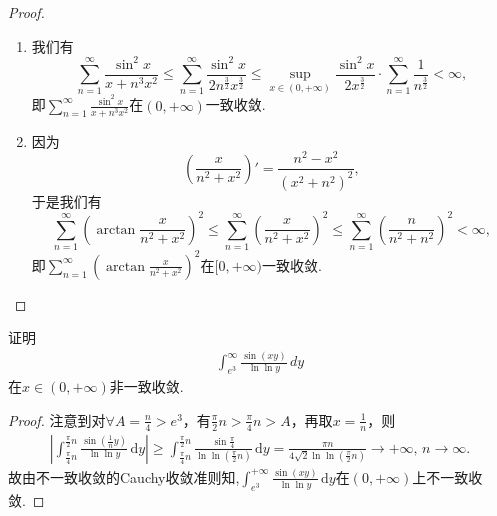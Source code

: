 \documentclass[../../main.tex]{subfiles}
\begin{document}
\begin{proof}
\begin{enumerate}
\item 我们有
\[
\sum_{n=1}^{\infty} \frac{\sin^2 x}{x + n^3 x^2} \leqslant \sum_{n=1}^{\infty} \frac{\sin^2 x}{2n^{\frac{3}{2}} x^{\frac{3}{2}}} \leqslant \sup_{x \in (0, +\infty)} \frac{\sin^2 x}{2x^{\frac{3}{2}}} \cdot \sum_{n=1}^{\infty} \frac{1}{n^{\frac{3}{2}}} < \infty,
\]
即\(\sum_{n=1}^{\infty} \frac{\sin^2 x}{x + n^3 x^2}\)在\((0, +\infty)\)一致收敛.

\item 因为
\[
\left( \frac{x}{n^2 + x^2} \right)' = \frac{n^2 - x^2}{(x^2 + n^2)^2},
\]
于是我们有
\[
\sum_{n=1}^{\infty} \left( \arctan \frac{x}{n^2 + x^2} \right)^2 \leqslant \sum_{n=1}^{\infty} \left( \frac{x}{n^2 + x^2} \right)^2 \leqslant \sum_{n=1}^{\infty} \left( \frac{n}{n^2 + n^2} \right)^2 < \infty,
\]
即\(\sum_{n=1}^{\infty} \left( \arctan \frac{x}{n^2 + x^2} \right)^2\)在\([0, +\infty)\)一致收敛.
\end{enumerate}

\end{proof}

\begin{example}
证明
\begin{align*}
\int_{e^3}^{\infty} \frac{\sin(xy)}{\ln \ln y} \, dy
\end{align*}
在$x \in (0, +\infty)$非一致收敛.
\end{example}
\begin{proof}
注意到对$\forall A= \frac{n}{4}>e^3$，有$\frac{\pi}{2}n>\frac{\pi}{4}n>A$，再取$x=\frac{1}{n}$，则
\begin{align*}
\left| \int_{\frac{\pi}{4}n}^{\frac{\pi}{2}n} \frac{\sin \left( \frac{1}{n}y \right)}{\ln\ln y} \,\mathrm{d}y \right| \geqslant \int_{\frac{\pi}{4}n}^{\frac{\pi}{2}n} \frac{\sin \frac{\pi}{4}}{\ln\ln \left( \frac{\pi}{2}n \right)} \,\mathrm{d}y = \frac{\pi n}{4\sqrt{2}\ln\ln \left( \frac{\pi}{2}n \right)} \rightarrow +\infty,\,n\rightarrow \infty.
\end{align*}
故由不一致收敛的Cauchy收敛准则知,$\int_{e^3}^{+\infty} \frac{\sin \left( xy \right)}{\ln\ln y} \,\mathrm{d}y$在$\left( 0,+\infty \right)$上不一致收敛.

\end{proof}
\end{document}
